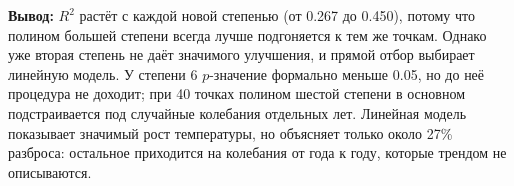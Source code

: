 \documentclass{article}
\begin{document}
    \textbf{Вывод:} $R^2$ растёт с каждой новой степенью (от 0.267 до 0.450), потому что полином большей степени всегда лучше подгоняется к тем же точкам. Однако уже вторая степень не даёт значимого улучшения, и прямой отбор выбирает линейную модель. У степени 6 $p$-значение формально меньше 0.05, но до неё процедура не доходит; при 40 точках полином шестой степени в основном подстраивается под случайные колебания отдельных лет. Линейная модель показывает значимый рост температуры, но объясняет только около 27\% разброса: остальное приходится на колебания от года к году, которые трендом не описываются.
\end{document}
